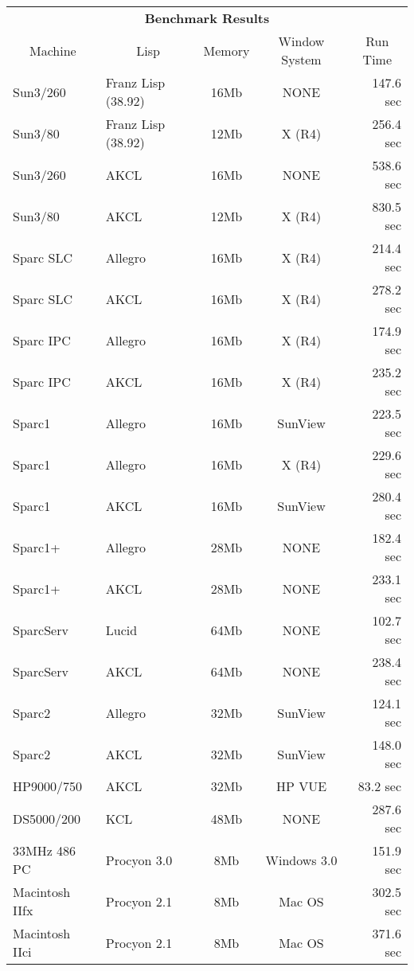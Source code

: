 {\begin{center}
\begin{tabular}{|l|l|c|c|r|}
\hline
\multicolumn{5}{|c|}{\bf Benchmark Results} \\
\multicolumn{1}{|c}{\sf Machine} &
\multicolumn{1}{c}{\sf Lisp} &
\multicolumn{1}{c}{\sf Memory} &
\multicolumn{1}{c}{\sf Window System} &
\multicolumn{1}{c|}{\sf Run Time} \\
\hline
Sun3/260       & Franz Lisp (38.92) &  16Mb  &    NONE       & 147.6 sec \\
Sun3/80        & Franz Lisp (38.92) &  12Mb  &    X (R4)     & 256.4 sec \\
Sun3/260       & AKCL               &  16Mb  &    NONE       & 538.6 sec \\
Sun3/80        & AKCL               &  12Mb  &    X (R4)     & 830.5 sec \\
Sparc SLC      & Allegro            &  16Mb  &    X (R4)     & 214.4 sec \\
Sparc SLC      & AKCL               &  16Mb  &    X (R4)     & 278.2 sec \\
Sparc IPC      & Allegro            &  16Mb  &    X (R4)     & 174.9 sec \\
Sparc IPC      & AKCL               &  16Mb  &    X (R4)     & 235.2 sec \\
Sparc1         & Allegro            &  16Mb  &   SunView     & 223.5 sec \\
Sparc1         & Allegro            &  16Mb  &    X (R4)     & 229.6 sec \\
Sparc1         & AKCL               &  16Mb  &   SunView     & 280.4 sec \\
Sparc1+        & Allegro            &  28Mb  &    NONE       & 182.4 sec \\
Sparc1+        & AKCL               &  28Mb  &    NONE       & 233.1 sec \\
SparcServ      & Lucid              &  64Mb  &    NONE       & 102.7 sec \\
SparcServ      & AKCL               &  64Mb  &    NONE       & 238.4 sec \\
Sparc2         & Allegro            &  32Mb  &   SunView     & 124.1 sec \\
Sparc2         & AKCL               &  32Mb  &   SunView     & 148.0 sec \\
HP9000/750     & AKCL               &  32Mb  &    HP VUE     & 83.2 sec \\
DS5000/200     & KCL                &  48Mb  &    NONE       & 287.6 sec \\
33MHz 486 PC   & Procyon 3.0        &   8Mb  &   Windows 3.0 & 151.9 sec \\
Macintosh IIfx & Procyon 2.1        &   8Mb  &   Mac OS      & 302.5 sec \\
Macintosh IIci & Procyon 2.1        &   8Mb  &   Mac OS      & 371.6 sec \\
\hline
\end{tabular}
\end{center}

}
